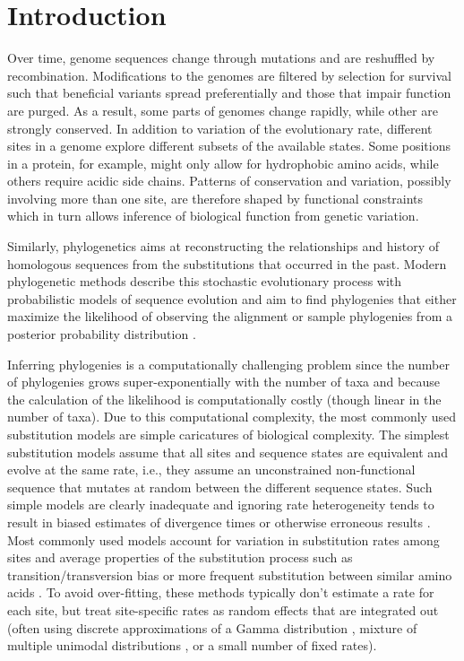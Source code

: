 \documentclass[aps,rmp,twocolumn,linenumbers]{revtex4-1}
\begin{document}
\maketitle

\section*{Introduction}
Over time, genome sequences change through mutations and are reshuffled by recombination.
Modifications to the genomes are filtered by selection for survival such that beneficial variants spread preferentially and those that impair function are purged.
As a result, some parts of genomes change rapidly, while other are strongly conserved.
In addition to variation of the evolutionary rate, different sites in a genome explore different subsets of the available states.
Some positions in a protein, for example, might only allow for hydrophobic amino acids, while others require acidic side chains.
Patterns of conservation and variation, possibly involving more than one site, are therefore shaped by functional constraints which in turn allows inference of biological function from genetic variation.

Similarly, phylogenetics aims at reconstructing the relationships and history of homologous sequences from the substitutions that occurred in the past.
Modern phylogenetic methods describe this stochastic evolutionary process with probabilistic models of sequence evolution and aim to find phylogenies that either maximize the likelihood of observing the alignment or sample phylogenies from a posterior probability distribution \citep{felsenstein2004inferring}.

Inferring phylogenies is a computationally challenging problem since the number of phylogenies grows super-exponentially with the number of taxa and because the calculation of the likelihood is computationally costly (though linear in the number of taxa).
Due to this computational complexity, the most commonly used substitution models are simple caricatures of biological complexity.
The simplest substitution models assume that all sites and sequence states are equivalent and evolve at the same rate, i.e., they assume an unconstrained non-functional sequence that mutates at random between the different sequence states.
Such simple models are clearly inadequate and ignoring rate heterogeneity tends to result in biased estimates of divergence times or otherwise erroneous results \citep{yang1996among}.
Most commonly used models account for variation in substitution rates among sites and average properties of the substitution process such as transition/transversion bias or more frequent substitution between similar amino acids \citep{yang_maximum_1994,FastTree2,nguyen_iq-tree:_2015,stamatakis_raxml_2014}.
To avoid over-fitting, these methods typically don't estimate a rate for each site, but treat site-specific rates as random effects that are integrated out (often using discrete approximations of a Gamma distribution \citep{yang1996among}, mixture of multiple unimodal distributions \citep{mayrose2005gamma}, or a small number of fixed rates).
\end{document}
